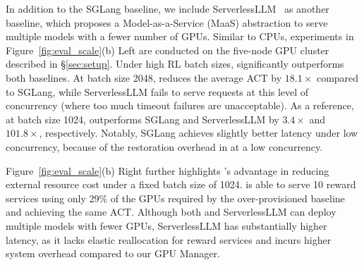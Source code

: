     
    
    
\smallskip {}
In addition to the SGLang baseline, we include ServerlessLLM~\citep{fu2024serverlessllm} as another baseline, which proposes a Model-as-a-Service (MaaS) abstraction to serve multiple models with a fewer number of GPUs.
Similar to CPUs, experiments in Figure~\ref{fig:eval_scale}(b) Left are conducted on the five-node GPU cluster described in \S\ref{sec:setup}.
Under high RL batch sizes, \sysname significantly outperforms both baselines.
At batch size 2048, \sysname reduces the average ACT by $18.1\times$ compared to SGLang, while ServerlessLLM fails to serve requests at this level of concurrency (where too much timeout failures are unacceptable). 
As a reference, at batch size 1024, \sysname outperforms SGLang and ServerlessLLM by $3.4\times$ and $101.8\times$, respectively.
Notably, SGLang achieves slightly better latency under low concurrency, because of the restoration overhead in \sysname at a low concurrency.

Figure~\ref{fig:eval_scale}(b) Right further highlights \sysname’s advantage in reducing external resource cost under a fixed batch size of 1024. \sysname is able to serve 10 reward services using only 29\% of the GPUs required by the over-provisioned baseline and achieving the same ACT.
Although both \sysname and ServerlessLLM can deploy multiple models with fewer GPUs, ServerlessLLM has substantially higher latency, as it lacks elastic reallocation for reward services and incurs higher system overhead compared to our GPU Manager.



